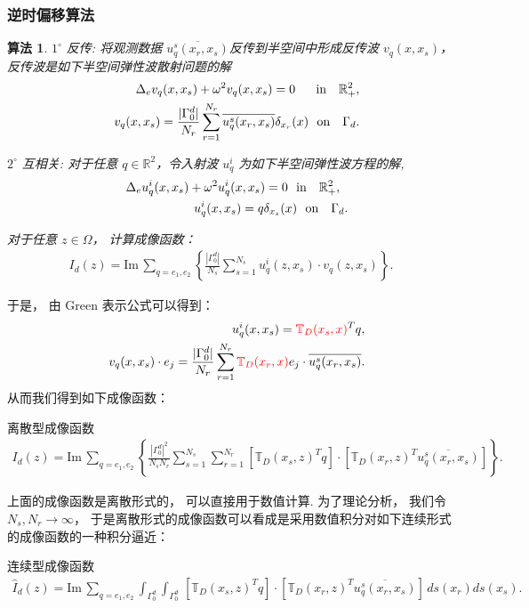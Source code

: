 \documentclass[8pt]{beamer}
\newcommand{\R}{\mathbb{R}}
\renewcommand{\Im}{\mathrm{Im}\,}
\newtheorem{alg}{算法}[section]
\newcommand{\Ga}{\Gamma}
\newcommand{\Om}{\Omega}
\newcommand{\de}{\delta}
\renewcommand{\Im}{\mathrm{Im}\,}
\newcommand{\T}{\mathbb{T}}
\newcommand{\ben}{\begin{eqnarray*}}
\newcommand{\een}{\end{eqnarray*}}
\begin{document}
\begin{frame}
\frametitle{逆时偏移算法}
\begin{alg}
	$1^\circ$ 反传: 将观测数据 $\overline{u_q^s(x_r,x_s)}$反传到半空间中形成反传波 $v_q(x,x_s)$， 反传波是如下半空间弹性波散射问题的解
\ben
& &\Delta_e v_q(x,x_s) + \omega^2 v_q(x,x_s) =0 \ \ \ \ \ \mbox{\rm in } \ \ \R^2_+, \\
& &v_q(x,x_s)=\frac{|\Ga_0^d|}{N_r}\sum_{r=1}^{N_r}\overline{u_q^s(x_r,x_s)}\delta_{x_r}(x) \ \ \mbox{\rm on }  \ \ \Ga_d.
\een

$2^\circ$ 互相关: 对于任意 $q\in\R^2$，令入射波 $u^i_q$ 为如下半空间弹性波方程的解,
\ben
& &\Delta_e u_q^i(x,x_s) + \omega^2 u_q^i(x,x_s) =0 \ \ \mbox{\rm in } \ \ \R^2_+,\ \ \\ & &u^i_q(x,x_s)=q\de_{x_s}(x)\ \ \mbox{on } \ \ \Ga_d.
\een

对于任意 $z\in\Om$， 计算成像函数：
\ben\label{cor1} 
I_d(z)=\Im\sum_{q=e_1,e_2}\left\{\frac{|\Gamma_0^d|}{N_s}\sum^{N_s}_{s=1} u^i_q(z,x_s)\cdot v_q(z,x_s)\right\}. 
\een
\end{alg}
\end{frame}
\begin{frame}
于是， 由 Green 表示公式可以得到：
	\ben
	& &u^i_q(x,x_s)=\textcolor{red}{\T_D(x_s,x)}^Tq, \\
	& &v_q(x,x_s)\cdot e_j=\frac{|\Ga_0^d|}{N_r}\sum_{r=1}^{N_r}\textcolor{red}{\T_D(x_r,x)}e_j\cdot\overline{u_q^s(x_r,x_s)}.
	\een 
从而我们得到如下成像函数：
\begin{block}{离散型成像函数}
\ben\label{cor}
I_d(z)=\Im\sum_{q=e_1,e_2}\left\{\frac{|\Gamma_0^d|^2}{N_sN_r}\sum^{N_s}_{s=1}\sum^{N_r}_{r=1}
[\T_D(x_s,z)^Tq]\cdot[\T_D(x_r,z)^T\overline{u^s_q(x_r,x_s)}]\right\}.
\een
\end{block}
上面的成像函数是离散形式的， 可以直接用于数值计算. 为了理论分析， 我们令 $N_s,N_r\to\infty$， 于是离散形式的成像函数可以看成是采用数值积分对如下连续形式的成像函数的一种积分逼近：
\begin{block}{连续型成像函数}
\ben
\hat{I}_d(z)=\Im\sum_{q=e_1,e_2}\int_{\Gamma_0^d}\int_{\Gamma_0^d}\,
[\T_D(x_s,z)^Tq]\cdot[\T_D(x_r,z)^T\overline{u^s_q(x_r,x_s)}]\,ds(x_r)ds(x_s).\label{cor2}
\een
\end{block}
\end{frame}
\end{document}
